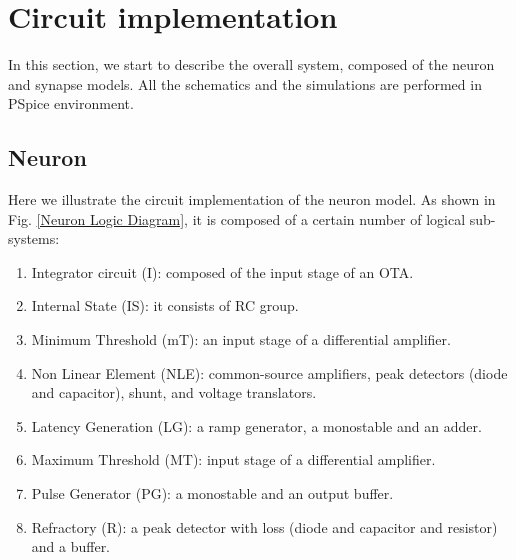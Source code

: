 \documentclass[review]{elsarticle}
\begin{document}



\section{Circuit implementation}
\label{CI}
In this section, we start to describe the overall system, composed of the neuron and synapse models. All the schematics and the simulations are performed in PSpice environment. 
\subsection{Neuron} 
\label{N_s} 
Here we illustrate the circuit implementation of the neuron model.
As shown in Fig. \ref{Neuron Logic Diagram}, it is composed of a certain number of logical sub-systems:

\begin{enumerate}
\item Integrator circuit (I): composed of the input stage of an OTA.
\item Internal State (IS): it consists of RC group.
\item Minimum Threshold (mT): an input stage of a differential amplifier.
\item Non Linear Element (NLE): common-source amplifiers, peak detectors (diode and capacitor), shunt, and voltage translators. 
\item Latency Generation (LG): a ramp generator, a monostable and an adder.
\item Maximum Threshold (MT): input stage of a differential amplifier. 
\item Pulse Generator (PG): a monostable and an output buffer.
\item Refractory (R): a peak detector with loss (diode and capacitor and resistor) and a buffer.
\end{enumerate}
\end{document}
